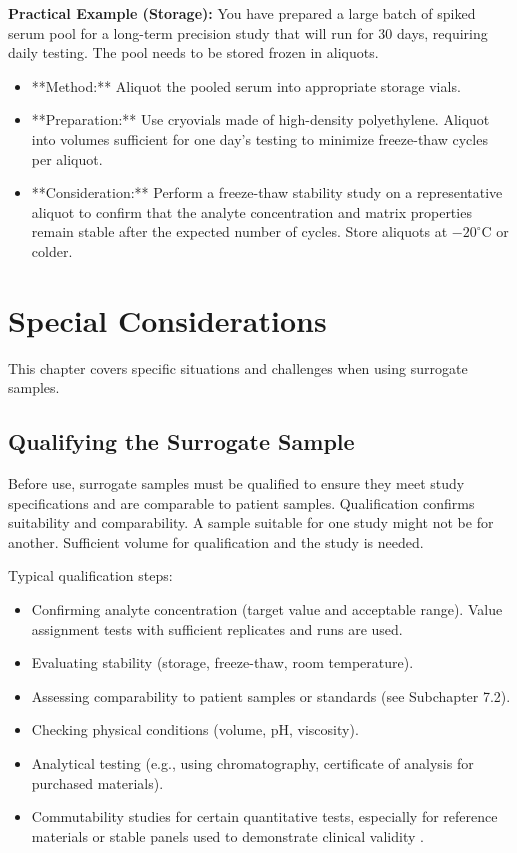 \documentclass{article}
\begin{document}
\textbf{Practical Example (Storage):}
You have prepared a large batch of spiked serum pool for a long-term precision study that will run for 30 days, requiring daily testing. The pool needs to be stored frozen in aliquots.
\begin{itemize}
    \item **Method:** Aliquot the pooled serum into appropriate storage vials.
    \item **Preparation:** Use cryovials made of high-density polyethylene. Aliquot into volumes sufficient for one day's testing to minimize freeze-thaw cycles per aliquot.
    \item **Consideration:** Perform a freeze-thaw stability study on a representative aliquot to confirm that the analyte concentration and matrix properties remain stable after the expected number of cycles. Store aliquots at $-20^\circ$C or colder.
\end{itemize}

\section{Special Considerations}

This chapter covers specific situations and challenges when using surrogate samples.

\subsection{Qualifying the Surrogate Sample}

Before use, surrogate samples must be qualified to ensure they meet study specifications and are comparable to patient samples. Qualification confirms suitability and comparability. A sample suitable for one study might not be for another. Sufficient volume for qualification and the study is needed.

Typical qualification steps:
\begin{itemize}
    \item Confirming analyte concentration (target value and acceptable range). Value assignment tests with sufficient replicates and runs are used.
    \item Evaluating stability (storage, freeze-thaw, room temperature).
    \item Assessing comparability to patient samples or standards (see Subchapter 7.2).
    \item Checking physical conditions (volume, pH, viscosity).
    \item Analytical testing (e.g., using chromatography, certificate of analysis for purchased materials).
    \item Commutability studies for certain quantitative tests, especially for reference materials or stable panels used to demonstrate clinical validity \cite{CLSIEP14, CLSIEP30}.
\end{itemize}
\end{document}
